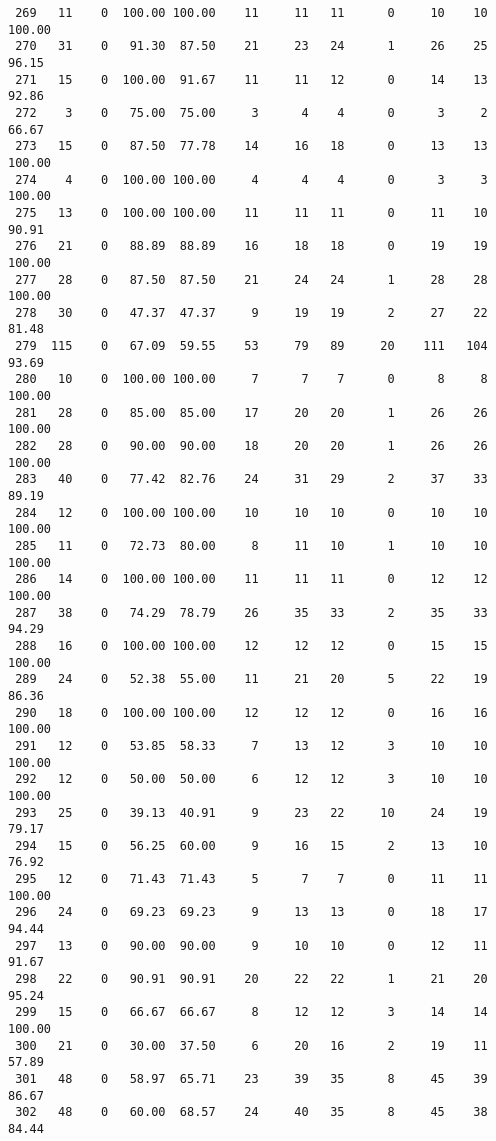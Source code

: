 \begin{verbatim}
 269   11    0  100.00 100.00    11     11   11      0     10    10   100.00
 270   31    0   91.30  87.50    21     23   24      1     26    25    96.15
 271   15    0  100.00  91.67    11     11   12      0     14    13    92.86
 272    3    0   75.00  75.00     3      4    4      0      3     2    66.67
 273   15    0   87.50  77.78    14     16   18      0     13    13   100.00
 274    4    0  100.00 100.00     4      4    4      0      3     3   100.00
 275   13    0  100.00 100.00    11     11   11      0     11    10    90.91
 276   21    0   88.89  88.89    16     18   18      0     19    19   100.00
 277   28    0   87.50  87.50    21     24   24      1     28    28   100.00
 278   30    0   47.37  47.37     9     19   19      2     27    22    81.48
 279  115    0   67.09  59.55    53     79   89     20    111   104    93.69
 280   10    0  100.00 100.00     7      7    7      0      8     8   100.00
 281   28    0   85.00  85.00    17     20   20      1     26    26   100.00
 282   28    0   90.00  90.00    18     20   20      1     26    26   100.00
 283   40    0   77.42  82.76    24     31   29      2     37    33    89.19
 284   12    0  100.00 100.00    10     10   10      0     10    10   100.00
 285   11    0   72.73  80.00     8     11   10      1     10    10   100.00
 286   14    0  100.00 100.00    11     11   11      0     12    12   100.00
 287   38    0   74.29  78.79    26     35   33      2     35    33    94.29
 288   16    0  100.00 100.00    12     12   12      0     15    15   100.00
 289   24    0   52.38  55.00    11     21   20      5     22    19    86.36
 290   18    0  100.00 100.00    12     12   12      0     16    16   100.00
 291   12    0   53.85  58.33     7     13   12      3     10    10   100.00
 292   12    0   50.00  50.00     6     12   12      3     10    10   100.00
 293   25    0   39.13  40.91     9     23   22     10     24    19    79.17
 294   15    0   56.25  60.00     9     16   15      2     13    10    76.92
 295   12    0   71.43  71.43     5      7    7      0     11    11   100.00
 296   24    0   69.23  69.23     9     13   13      0     18    17    94.44
 297   13    0   90.00  90.00     9     10   10      0     12    11    91.67
 298   22    0   90.91  90.91    20     22   22      1     21    20    95.24
 299   15    0   66.67  66.67     8     12   12      3     14    14   100.00
 300   21    0   30.00  37.50     6     20   16      2     19    11    57.89
 301   48    0   58.97  65.71    23     39   35      8     45    39    86.67
 302   48    0   60.00  68.57    24     40   35      8     45    38    84.44

\end{verbatim}
